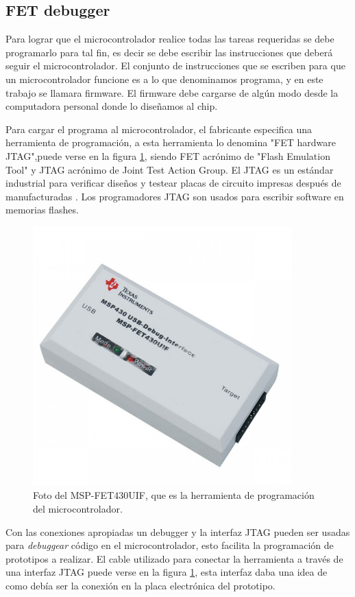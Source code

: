 \subsection{FET debugger}

Para lograr que el microcontrolador realice todas las tareas requeridas se debe programarlo para tal fin, es decir se debe escribir las instrucciones que deberá seguir el microcontrolador. El conjunto de instrucciones que se escriben para que un microcontrolador funcione es a lo que denominamos programa, y en este trabajo se llamara firmware. El firmware debe cargarse de algún modo desde la computadora personal donde lo diseñamos al chip. 

Para cargar el programa al microcontrolador, el fabricante especifica una herramienta de programación, a esta herramienta lo denomina  "FET hardware JTAG",puede verse en la figura \ref{fig:mspFETtool}, siendo FET acrónimo de "Flash Emulation Tool" y JTAG acrónimo de Joint Test Action Group. El JTAG es un estándar industrial para verificar diseños y testear placas de circuito impresas después de manufacturadas \cite{JTAGintel}. Los programadores JTAG son usados para escribir software en memorias flashes.

\begin{figure}[!h]
	\centering
	\includegraphics[width=100mm,keepaspectratio]{Figures/emeesepeFET.jpg}
	\caption{ Foto del MSP-FET430UIF, que es la herramienta de programación del microcontrolador.}
	\label{fig:mspFETtool}
\end{figure}

Con las conexiones apropiadas un debugger y la interfaz JTAG pueden ser usadas para \textit{debuggear} código en el microcontrolador, esto facilita la programación de prototipos a realizar. El cable utilizado para conectar la herramienta a través de una interfaz JTAG puede verse en la figura \ref{fig:mspFETtool}, esta interfaz daba una idea de como debía ser la conexión en la placa electrónica del prototipo.

